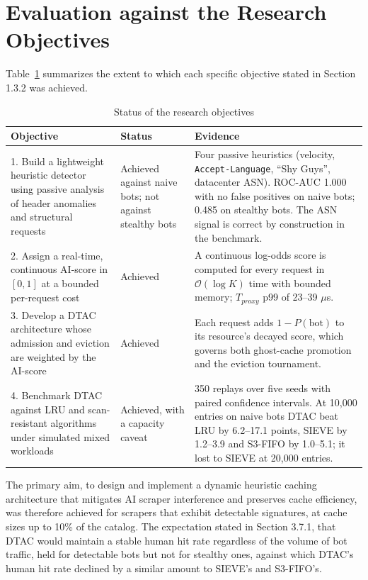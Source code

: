 \section{Evaluation against the Research Objectives}
Table~\ref{tab:objectives} summarizes the extent to which each specific objective stated in Section 1.3.2 was achieved.

\begin{table}[htbp]
    \centering
    \caption{Status of the research objectives}
    \label{tab:objectives}
    \small
    \begin{tabular}{p{}p{}p{}}
        \toprule
        Objective & Status & Evidence \\
        \midrule
        1. Build a lightweight heuristic detector using passive analysis of header anomalies and structural requests & Achieved against naive bots; not against stealthy bots & Four passive heuristics (velocity, \texttt{Accept-Language}, ``Shy Guys'', datacenter ASN). ROC-AUC 1.000 with no false positives on naive bots; 0.485 on stealthy bots. The ASN signal is correct by construction in the benchmark. \\
        \midrule
        2. Assign a real-time, continuous AI-score in $[0, 1]$ at a bounded per-request cost & Achieved & A continuous log-odds score is computed for every request in $\mathcal{O}(\log K)$ time with bounded memory; $T_{proxy}$ p99 of 23--39 $\mu$s. \\
        \midrule
        3. Develop a DTAC architecture whose admission and eviction are weighted by the AI-score & Achieved & Each request adds $1 - P(\text{bot})$ to its resource's decayed score, which governs both ghost-cache promotion and the eviction tournament. \\
        \midrule
        4. Benchmark DTAC against LRU and scan-resistant algorithms under simulated mixed workloads & Achieved, with a capacity caveat & 350 replays over five seeds with paired confidence intervals. At 10{,}000 entries on naive bots DTAC beat LRU by 6.2--17.1 points, SIEVE by 1.2--3.9 and S3-FIFO by 1.0--5.1; it lost to SIEVE at 20{,}000 entries. \\
        \bottomrule
    \end{tabular}
\end{table}

The primary aim, to design and implement a dynamic heuristic caching architecture that mitigates AI scraper interference and preserves cache efficiency, was therefore achieved for scrapers that exhibit detectable signatures, at cache sizes up to 10\% of the catalog. The expectation stated in Section 3.7.1, that DTAC would maintain a stable human hit rate regardless of the volume of bot traffic, held for detectable bots but not for stealthy ones, against which DTAC's human hit rate declined by a similar amount to SIEVE's and S3-FIFO's.

